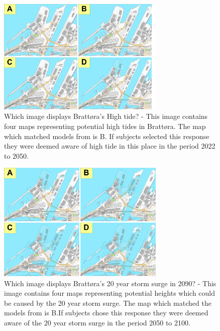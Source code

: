 \begin{figure} [h!]
    \centering
    \includegraphics[width=8cm]{fig/brattora question on 2022 high tide quadrant.png}
    \caption{Which image displays Brattøra's High tide? -  This image contains four maps representing potential high tides in Brattøra. The map which matched models from \cite{kartverket_se_2021} is B. If subjects selected this response they were deemed aware of high tide in this place in the period 2022 to 2050. }
    \label{fig:Brattora_2022_hightide}
\end{figure}

\begin{figure}[h!]
    \centering
    \includegraphics[width=8cm]{fig/brattora question on 2090 20 yr storm surge quadrant.png} 
    \caption{Which image displays Brattøra's 20 year storm surge in 2090? - This image contains four maps representing potential heights which could be caused by the 20 year storm surge. The map which matched the models from \cite{kartverket_se_2021} is B.If subjects chose this response they were deemed aware of the 20 year storm surge in the period 2050 to 2100. }
    \label{fig:brattora_2090_stormsurge}
\end{figure}

